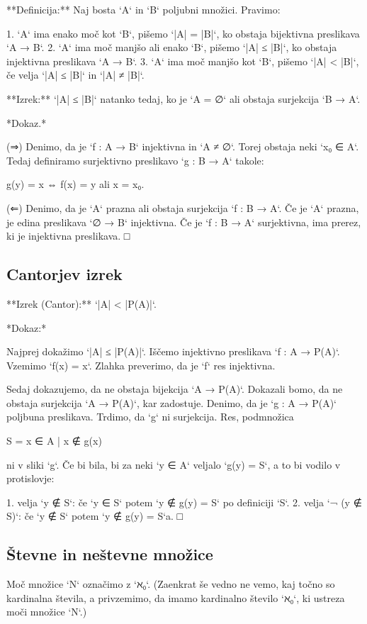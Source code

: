 **Definicija:** Naj bosta `A` in `B` poljubni množici. Pravimo:

1. `A` ima enako moč kot `B`, pišemo `|A| = |B|`, ko obstaja bijektivna preslikava `A → B`.
2. `A` ima moč manjšo ali enako `B`, pišemo `|A| ≤ |B|`, ko obstaja injektivna preslikava `A → B`.
3. `A` ima moč manjšo kot `B`, pišemo `|A| < |B|`, če velja `|A| ≤ |B|` in `|A| ≠ |B|`.

**Izrek:** `|A| ≤ |B|` natanko tedaj, ko je `A = ∅` ali obstaja surjekcija `B → A`.

*Dokaz.*

(⇒) Denimo, da je `f : A → B` injektivna in `A ≠ ∅`. Torej obstaja neki `x₀ ∈ A`.
Tedaj definiramo surjektivno preslikavo `g : B → A` takole:

    g(y) = x  ⇔  f(x) = y ali x = x₀.

(⇐) Denimo, da je `A` prazna ali obstaja surjekcija `f : B → A`. Če je `A`
prazna, je edina preslikava `∅ → B` injektivna. Če je `f : B → A` surjektivna,
ima prerez, ki je injektivna preslikava. □

\subsection{Cantorjev izrek}

**Izrek (Cantor):** `|A| < |P(A)|`.

*Dokaz:*

Najprej dokažimo `|A| ≤ |P(A)|`. Iščemo injektivno preslikava `f : A → P(A)`.
Vzemimo `f(x) = {x}`. Zlahka preverimo, da je `f` res injektivna.

Sedaj dokazujemo, da ne obstaja bijekcija `A → P(A)`. Dokazali bomo, da ne obstaja
surjekcija `A → P(A)`, kar zadostuje. Denimo, da je `g : A → P(A)` poljbuna preslikava.
Trdimo, da `g` ni surjekcija. Res, podmnožica

    S = {x ∈ A | x ∉ g(x) }

ni v sliki `g`. Če bi bila, bi za neki `y ∈ A` veljalo `g(y) = S`, a to bi
vodilo v protislovje:

1. velja `y ∉ S`: če `y ∈ S` potem `y ∉ g(y) = S` po definiciji `S`.
2. velja `¬ (y ∉ S)`: če `y ∉ S` potem `y ∉ g(y) = S`a. □


\subsection{Števne in neštevne množice}

Moč množice `N` označimo z `ℵ₀`. (Zaenkrat še vedno ne vemo, kaj točno so
kardinalna števila, a privzemimo, da imamo kardinalno število `ℵ₀`, ki ustreza
moči množice `N`.)

